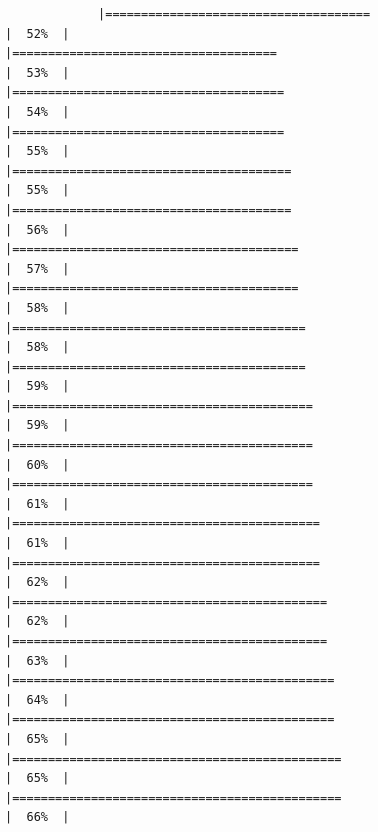 \documentclass[
]{article}
\begin{document}
\begin{verbatim}
             |=====================================                                 |  52%  |                                                                              |=====================================                                 |  53%  |                                                                              |======================================                                |  54%  |                                                                              |======================================                                |  55%  |                                                                              |=======================================                               |  55%  |                                                                              |=======================================                               |  56%  |                                                                              |========================================                              |  57%  |                                                                              |========================================                              |  58%  |                                                                              |=========================================                             |  58%  |                                                                              |=========================================                             |  59%  |                                                                              |==========================================                            |  59%  |                                                                              |==========================================                            |  60%  |                                                                              |==========================================                            |  61%  |                                                                              |===========================================                           |  61%  |                                                                              |===========================================                           |  62%  |                                                                              |============================================                          |  62%  |                                                                              |============================================                          |  63%  |                                                                              |=============================================                         |  64%  |                                                                              |=============================================                         |  65%  |                                                                              |==============================================                        |  65%  |                                                                              |==============================================                        |  66%  |                                                                  
\end{verbatim}
\end{document}
